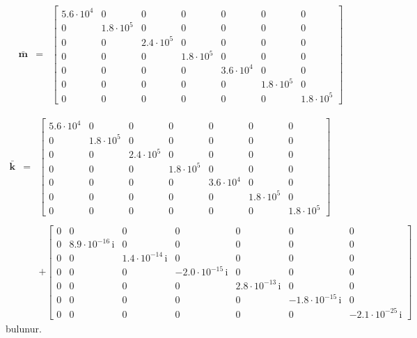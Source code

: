 \documentclass[a4paper]{report}
\begin{document}
\begin{eqnarray*}
\bar{ \mathbf{m}}&=&\left[\begin{array}{ccccccc} 5.6\cdot 10^4 & 0 & 0 & 0 & 0 & 0 & 0\\ 0 & 1.8\cdot 10^5& 0 & 0 & 0 & 0 & 0\\ 0 & 0 & 2.4\cdot 10^5  & 0 & 0 & 0 & 0\\ 0 & 0 & 0 & 1.8\cdot 10^5 & 0 & 0 & 0\\ 0 & 0 & 0 & 0 & 3.6\cdot 10^4 & 0 & 0\\ 0 & 0 & 0 & 0 & 0 & 1.8\cdot 10^5  & 0\\ 0 & 0 & 0 & 0 & 0 & 0 & 1.8\cdot 10^5  \end{array}\right]
\end{eqnarray*}

\begin{eqnarray*}
\bar{ \mathbf{k} }&=&\left[\begin{array}{ccccccc} 5.6\cdot 10^4 & 0 & 0 & 0 & 0 & 0 & 0\\ 0 & 1.8\cdot 10^5  & 0 & 0 & 0 & 0 & 0\\ 0 & 0 & 2.4\cdot 10^5 & 0 & 0 & 0 & 0\\ 0 & 0 & 0 & 1.8\cdot 10^5  & 0 & 0 & 0\\ 0 & 0 & 0 & 0 & 3.6\cdot 10^4  & 0 & 0\\ 0 & 0 & 0 & 0 & 0 & 1.8\cdot 10^5 & 0\\ 0 & 0 & 0 & 0 & 0 & 0 & 1.8\cdot 10^5  \end{array}\right]\\
&&\\
&&+\left[\begin{array}{ccccccc} 0 & 0 & 0 & 0 & 0 & 0 & 0\\ 0 &  8.9\cdot 10^{-16}\, \mathrm{i} & 0 & 0 & 0 & 0 & 0\\ 0 & 0 &  1.4\cdot 10^{-14}\, \mathrm{i} & 0 & 0 & 0 & 0\\ 0 & 0 & 0 & - 2.0\cdot 10^{-15}\, \mathrm{i} & 0 & 0 & 0\\ 0 & 0 & 0 & 0 &  2.8\cdot 10^{-13}\, \mathrm{i} & 0 & 0\\ 0 & 0 & 0 & 0 & 0 & - 1.8\cdot 10^{-15}\, \mathrm{i} & 0\\ 0 & 0 & 0 & 0 & 0 & 0 & - 2.1\cdot 10^{-25}\, \mathrm{i} \end{array}\right]
\end{eqnarray*}
bulunur. 
\end{document}

